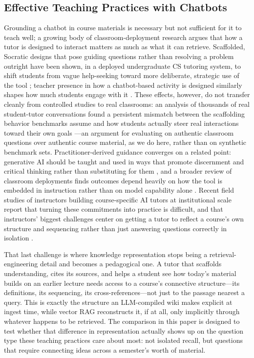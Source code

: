 \documentclass[letterpaper]{article} %
\begin{document}
\subsection{Effective Teaching Practices with Chatbots}

Grounding a chatbot in course materials is necessary but not sufficient for it to teach well; a growing body of classroom-deployment research argues that how a tutor is designed to interact matters as much as what it can retrieve. Scaffolded, Socratic designs that pose guiding questions rather than resolving a problem outright have been shown, in a deployed undergraduate CS tutoring system, to shift students from vague help-seeking toward more deliberate, strategic use of the tool \citep{sunil2025socraticai}; teacher presence in how a chatbot-based activity is designed similarly shapes how much students engage with it \citep{li2025teacher}. These effects, however, do not transfer cleanly from controlled studies to real classrooms: an analysis of thousands of real student-tutor conversations found a persistent mismatch between the scaffolding behavior benchmarks assume and how students actually steer real interactions toward their own goals \citep{neagu2026rethinking}---an argument for evaluating on authentic classroom questions over authentic course material, as we do here, rather than on synthetic benchmark sets. Practitioner-derived guidance converges on a related point: generative AI should be taught and used in ways that promote discernment and critical thinking rather than substituting for them \citep{wall2025generative}, and a broader review of classroom deployments finds outcomes depend heavily on how the tool is embedded in instruction rather than on model capability alone \citep{wang2025generative}. Recent field studies of instructors building course-specific AI tutors at institutional scale report that turning these commitments into practice is difficult, and that instructors' biggest challenges center on getting a tutor to reflect a course's own structure and sequencing rather than just answering questions correctly in isolation \citep{ko2026toward}.

That last challenge is where knowledge representation stops being a retrieval-engineering detail and becomes a pedagogical one. A tutor that scaffolds understanding, cites its sources, and helps a student see how today's material builds on an earlier lecture needs access to a course's connective structure---its definitions, its sequencing, its cross-references---not just to the passage nearest a query. This is exactly the structure an LLM-compiled wiki makes explicit at ingest time, while vector RAG reconstructs it, if at all, only implicitly through whatever happens to be retrieved. The comparison in this paper is designed to test whether that difference in representation actually shows up on the question type these teaching practices care about most: not isolated recall, but questions that require connecting ideas across a semester's worth of material.
\end{document}
